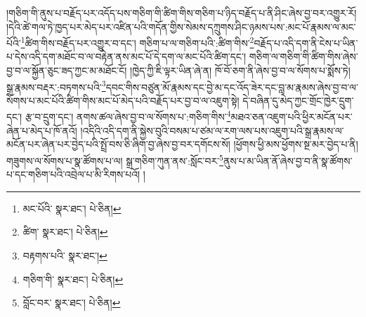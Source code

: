 །གཅིག་གི་ནུས་པ་བརྗོད་པར་འདོད་པས་གཅིག་གི་ཚིག་གིས་གཅིག་པ་ཉིད་བརྗོད་པ་ནི་ཤིང་ཞེས་བྱ་བར་འགྱུར་རོ། །དེའི་ཚེ་གལ་ཏེ་ཁྱད་པར་མེད་པར་འཛིན་པའི་གདོན་གྱིས་སེམས་དཀྲུགས་ཤིང་ཉམས་པས་:མང་པོ་རྣམས་ལ་མང་པོའི་\footnote{མང་པོའི་  སྣར་ཐང་།  པེ་ཅིན། }ཚིག་གིས་བརྗོད་པར་འགྱུར་བ་དང་། གཅིག་པ་ལ་གཅིག་པའི་:ཚིག་གིས་\footnote{ཚིག་  སྣར་ཐང་།  པེ་ཅིན། }བརྗོད་པ་འདི་དག་ནི་ངེས་པ་ཡིན་པ་དེས་འདི་དག་མཐོང་བ་ལ་བརྟེན་ནས་མང་པོ་དེ་དག་ལ་མང་པོའི་ཚིག་དང་། གཅིག་ལ་གཅིག་གི་ཚིག་གིས་ཞེས་བྱ་བ་ལ་སྐྱོན་ཅུང་ཟད་ཀྱང་མ་མཐོང་ངོ། །ཁྱེད་ཀྱི་ཇི་ལྟར་ཡིན་ཞེ་ན། ཁོ་བོ་ཅག་ནི་ཞེས་བྱ་བ་ལ་སོགས་པ་སྨོས་ཏེ། སྒྲ་རྣམས་བརྡར་:བཏགས་པའི་\footnote{བརྟགས་པའི་  སྣར་ཐང་། }དབང་གིས་བཙུན་མོ་རྣམས་དང་བྱེ་མ་དང་འོད་ཟེར་དང་བླ་མ་རྣམས་ཞེས་བྱ་བ་ལ་སོགས་པ་མང་པོའི་ཚིག་གིས་མང་པོ་མེད་པའི་བརྗོད་པར་བྱ་བ་ལ་འཇུག་སྟེ། དེ་བཞིན་དུ་མེད་ཀྱང་གྲོང་ཁྱེར་དྲུག་དང་། རྩ་བ་དྲུག་དང་། ནགས་ཚལ་ཞེས་བྱ་བ་ལ་སོགས་པ་:གཅིག་གིས་\footnote{གཅིག་གི་  སྣར་ཐང་།  པེ་ཅིན། }མཐའ་ཅན་འཇུག་པའི་ཕྱིར་མངོན་པར་ཞེན་པ་མེད་པ་ཁོ་ནའོ། །འདིའི་འདི་དག་ནི་སྐྱེས་བུའི་བསམ་པ་ཙམ་ལ་རག་ལས་པས་འཇུག་པའི་སྒྲ་རྣམས་ལ་མངོན་པར་ཞེན་པར་བྱེད་པའི་སྤྲོ་བས་ཅི་ཞིག་བྱ་ཞེས་བྱ་བར་དགོངས་སོ། །ཕྱོགས་ཕྱི་མས་ཕྱོགས་སྔ་མར་བྱེད་པ་ནི། གཟུགས་ལ་སོགས་པ་སྣ་ཚོགས་པ་ལ། སྒྲ་གཅིག་ཀུན་ནས་:སློང་བར་\footnote{བློང་བར་  སྣར་ཐང་།  པེ་ཅིན། }ནུས་པ་མ་ཡིན་ནོ་ཞེས་བྱ་བ་ནི་སྣ་ཚོགས་པ་དང་གཅིག་པའི་འབྲེལ་པ་མི་རིགས་པའོ། །
